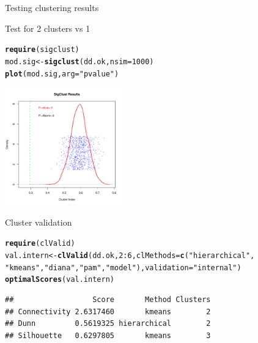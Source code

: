 \documentclass[10pt,xcolor=dvipsnames]{beamer}\usepackage[]{graphicx}\usepackage[]{color}
\makeatletter
\newcommand{\hlnum}[1]{\textcolor[rgb]{0.686,0.059,0.569}{#1}}%
\newcommand{\hlstr}[1]{\textcolor[rgb]{0.192,0.494,0.8}{#1}}%
\newcommand{\hlopt}[1]{\textcolor[rgb]{0,0,0}{#1}}%
\newcommand{\hlstd}[1]{\textcolor[rgb]{0.345,0.345,0.345}{#1}}%
\newcommand{\hlkwb}[1]{\textcolor[rgb]{0.69,0.353,0.396}{#1}}%
\newcommand{\hlkwc}[1]{\textcolor[rgb]{0.333,0.667,0.333}{#1}}%
\newcommand{\hlkwd}[1]{\textcolor[rgb]{0.737,0.353,0.396}{\textbf{#1}}}%
\newenvironment{kframe}{%
 \def\at@end@of@kframe{}%
 \ifinner\ifhmode%
  \def\at@end@of@kframe{\end{minipage}}%
  \begin{minipage}{\columnwidth}%
 \fi\fi%
 \def\FrameCommand##1{\hskip\@totalleftmargin \hskip-\fboxsep
 \colorbox{shadecolor}{##1}\hskip-\fboxsep
     \hskip-\linewidth \hskip-\@totalleftmargin \hskip\columnwidth}%
 \MakeFramed {\advance\hsize-\width
   \@totalleftmargin\z@ \linewidth\hsize
   \@setminipage}}%
 {\par\unskip\endMakeFramed%
 \at@end@of@kframe}
\newenvironment{knitrout}{}{} %
\makeatother
\begin{document}
\begin{frame}{Testing clustering results}

Test for 2 clusters vs 1 

\begin{knitrout}\footnotesize
{}\color{fgcolor}\begin{kframe}
\begin{alltt}
\hlkwd{require}\hlstd{(sigclust)}
\hlstd{mod.sig} \hlkwb{<-}\hlkwd{sigclust}\hlstd{(dd.ok,} \hlkwc{nsim}\hlstd{=}\hlnum{1000}\hlstd{)}
\hlkwd{plot}\hlstd{(mod.sig,} \hlkwc{arg}\hlstd{=}\hlstr{"pvalue"}\hlstd{)}
\end{alltt}
\end{kframe}

{\centering \includegraphics[width=2in]{figure/plotTest-1} 

}



\end{knitrout}

\end{frame}


\begin{frame}{Cluster validation}
\begin{knitrout}\footnotesize
{}\color{fgcolor}\begin{kframe}
\begin{alltt}
\hlkwd{require}\hlstd{(clValid)}
\hlstd{val.intern} \hlkwb{<-} \hlkwd{clValid}\hlstd{(dd.ok,} \hlnum{2}\hlopt{:}\hlnum{6}\hlstd{,} \hlkwc{clMethods} \hlstd{=} \hlkwd{c}\hlstd{(}\hlstr{"hierarchical"}\hlstd{,}
 \hlstr{"kmeans"}\hlstd{,} \hlstr{"diana"}\hlstd{,} \hlstr{"pam"}\hlstd{,}  \hlstr{"model"}\hlstd{),} \hlkwc{validation} \hlstd{=} \hlstr{"internal"}\hlstd{)}
\hlkwd{optimalScores}\hlstd{(val.intern)}
\end{alltt}
\begin{verbatim}
##                  Score       Method Clusters
## Connectivity 2.6317460       kmeans        2
## Dunn         0.5619325 hierarchical        2
## Silhouette   0.6297805       kmeans        3
\end{verbatim}
\end{kframe}
\end{knitrout}
\end{frame}
\end{document}
